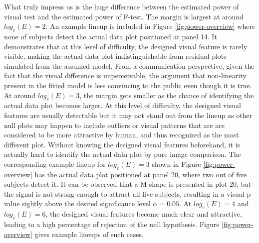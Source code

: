 \documentclass[]{interact}
\theoremstyle{plain}%
\theoremstyle{definition}
\theoremstyle{remark}
\begin{document}
What truly impress us is the huge difference between the estimated power
of visual test and the estimated power of F-test. The margin is largest
at around \(log_e(E) = 2\). An example lineup is included in Figure
\ref{fig:power-overview} where none of subjects detect the actual data
plot positioned at panel 14. It demonstrates that at this level of
difficulty, the designed visual feature is rarely visible, making the
actual data plot indistinguishable from residual plots simulated from
the assumed model. From a communication perspective, given the fact that
the visual difference is unperceivable, the argument that non-linearity
present in the fitted model is less convincing to the public even though
it is true. At around \(log_e(E) = 3\), the margin gets smaller as the
chance of identifying the actual data plot becomes larger. At this level
of difficulty, the designed visual features are usually detectable but
it may not stand out from the lineup as other null plots may happen to
include outliers or visual patterns that are are considered to be more
attractive by human, and thus recognized as the most different plot.
Without knowing the designed visual features beforehand, it is actually
hard to identify the actual data plot by pure image comparison. The
corresponding example lineup for \(log_e(E) = 3\) shown in Figure
\ref{fig:power-overview} has the actual data plot positioned at panel
20, where two out of five subjects detect it. It can be observed that a
M-shape is presented in plot 20, but the signal is not strong enough to
attract all five subjects, resulting in a visual p-value sightly above
the desired significance level \(\alpha = 0.05\). At \(log_e(E) = 4\)
and \(log_e(E) = 6\), the designed visual features become much clear and
attractive, leading to a high percentage of rejection of the null
hypothesis. Figure \ref{fig:power-overview} gives example lineups of
such cases.
\end{document}
